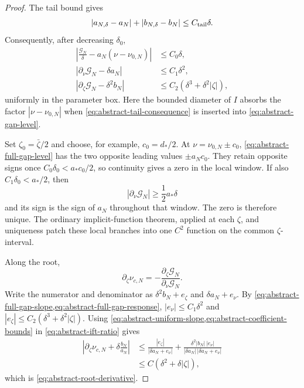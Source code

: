 \begin{proof}
The tail bound gives
\begin{equation}
 |a_{N,\delta}-a_N|+|b_{N,\delta}-b_N|
 \le C_{\rm tail}\delta.                            \label{eq:abstract-tail-consequence}
\end{equation}
Consequently, after decreasing \(\delta_0\),
\begin{align}
 \left|\frac{\mathscr G_N}{\delta}
       -a_N(\nu-\nu_{0,N})\right|&\le C_0\delta,
 \label{eq:abstract-full-gap-level}\\
 |\partial_\nu\mathscr G_N-\delta a_N|&\le C_1\delta^2,
 \label{eq:abstract-full-gap-slope}\\
 |\partial_\zeta\mathscr G_N-\delta^2b_N|
 &\le C_2(\delta^3+\delta^2|\zeta|),
 \label{eq:abstract-full-gap-response}
\end{align}
uniformly in the parameter box.  Here the bounded diameter of \(I\) absorbs
the factor \(|\nu-\nu_{0,N}|\) when
\cref{eq:abstract-tail-consequence} is inserted into
\cref{eq:abstract-gap-level}.

Set \(\zeta_0=\bar\zeta/2\) and choose, for example,
\(c_0=d_*/2\).  At
\(\nu=\nu_{0,N}\pm c_0\),
\cref{eq:abstract-full-gap-level} has the two opposite leading values
\(\pm a_Nc_0\).  They retain opposite signs once
\(C_0\delta_0<a_*c_0/2\), so continuity gives a zero in the local
window.  If also \(C_1\delta_0<a_*/2\), then
\begin{equation}
 |\partial_\nu\mathscr G_N|\ge\frac12a_*\delta
 \label{eq:abstract-uniform-slope}
\end{equation}
and its sign is the sign of \(a_N\) throughout that window.  The zero is
therefore unique.  The ordinary implicit-function theorem, applied at each
\(\zeta\), and uniqueness patch these local branches into one \(C^2\)
function on the common \(\zeta\)-interval.

Along the root,
\begin{equation}
 \partial_\zeta\nu_{c,N}
 =-\frac{\partial_\zeta\mathscr G_N}
          {\partial_\nu\mathscr G_N}.                \label{eq:abstract-ift-ratio}
\end{equation}
Write the numerator and denominator as
\(\delta^2b_N+e_\zeta\) and \(\delta a_N+e_\nu\).  By
\cref{eq:abstract-full-gap-slope,eq:abstract-full-gap-response},
\(|e_\nu|\le C_1\delta^2\) and
\(|e_\zeta|\le C_2(\delta^3+\delta^2|\zeta|)\).  Using
\cref{eq:abstract-uniform-slope,eq:abstract-coefficient-bounds} in
\cref{eq:abstract-ift-ratio} gives
\begin{align*}
 \left|\partial_\zeta\nu_{c,N}
       +\delta\frac{b_N}{a_N}\right|
 &\le \frac{|e_\zeta|}{|\delta a_N+e_\nu|}
  +\frac{\delta^2|b_N|\,|e_\nu|}
   {|\delta a_N|\,|\delta a_N+e_\nu|} \\
 &\le C(\delta^2+\delta|\zeta|),
\end{align*}
which is \cref{eq:abstract-root-derivative}.


\end{proof}

